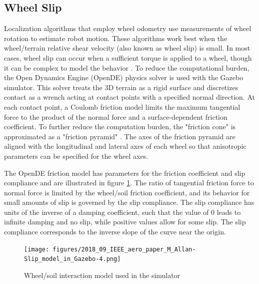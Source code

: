 \documentclass[twocolumn,letterpaper]{IEEEAerospaceCLS}  %
\begin{document}
\subsection{Wheel Slip}
Localization algorithms that employ wheel odometry use measurements of wheel rotation to estimate robot motion.
These algorithms work best when the wheel/terrain relative shear velocity (also known as wheel slip) is small.
In most cases, wheel slip can occur when a sufficient torque is applied to a wheel,
though it can be complex to model the behavior \cite{yoshida1013712}.
To reduce the computational burden, the Open Dynamics Engine (OpenDE) physics solver is used with the Gazebo simulator.
This solver treats the 3D terrain as a rigid surface and discretizes contact as a wrench
acting at contact points with a specified normal direction.
At each contact point, a Coulomb friction model limits the maximum tangential force
to the product of the normal force and a surface-dependent friction coefficient.
To further reduce the computation burden, the "friction cone" is approximated
as a "friction pyramid" \cite{hsuPeters2014}.
The axes of the friction pyramid are aligned with the longitudinal and lateral axes of each wheel
so that anisotropic parameters can be specified for the wheel axes.

The OpenDE friction model has parameters for the friction coefficient and slip compliance
and are illustrated in figure \ref{fig:wheelsoilmodel}.
The ratio of tangential friction force to normal force is limited by the wheel/soil friction coefficient,
and its behavior for small amounts of slip is governed by the slip compliance.
The slip compliance has units of the inverse of a damping coefficient,
such that the value of 0 leads to infinite damping and no slip,
while positive values allow for some slip.
The slip compliance corresponds to the inverse slope of the curve near the origin.

\begin{figure}[h!]
    \texttt{[image: figures/2018\_09\_IEEE\_aero\_paper\_M\_Allan-Slip\_model\_in\_Gazebo-4.png]}
    \caption{Wheel/soil interaction model used in the simulator}
    \label{fig:wheelsoilmodel}
\end{figure}
\end{document}
